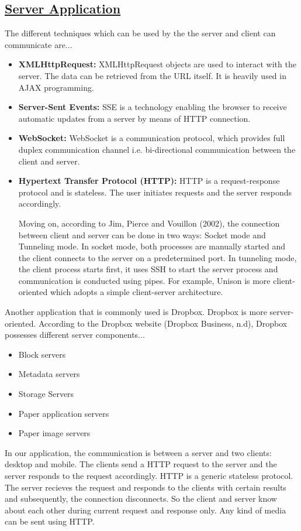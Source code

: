 \documentclass{article}
\begin{document}
\subsection{\underline{Server Application}}
The different techniques which can be used by the the server and client can communicate are...
\begin{itemize}
\item \textbf{XMLHttpRequest:} XMLHttpRequest objects are used to interact with the server. The data can be retrieved from the URL itself. It is heavily used in AJAX programming.
\item \textbf{Server-Sent Events:} SSE is a technology enabling the browser to receive automatic updates from a server by means of HTTP connection.
\item \textbf{WebSocket:} WebSocket is a communication protocol, which provides full duplex communication channel i.e. bi-directional communication between the client and server.
\item \textbf{Hypertext Transfer Protocol (HTTP):} HTTP is a request-response protocol and is stateless. The user initiates requests and the server responds accordingly.

Moving on, according to Jim, Pierce and Vouillon (2002), the connection between client and server can be done in two ways: Socket mode and Tunneling mode. In socket mode, both processes are manually started and the client connects to the server on a predetermined port. In tunneling mode, the client process starts first, it uses SSH to start the server process and communication is conducted using pipes. For example, Unison is more client-oriented which adopts a simple client-server architecture.
\end{itemize}
 
Another application that is commonly used is Dropbox. Dropbox is more server-oriented. According to the Dropbox website (Dropbox Business, n.d), Dropbox possesses different server components...
\begin{itemize}
\item Block servers
\item Metadata servers
\item Storage Servers
\item Paper application servers
\item Paper image servers
\end{itemize}

In our application, the communication is between a server and two clients: desktop and mobile. The clients send a HTTP request to the server and the server responds to the request accordingly. HTTP is a generic stateless protocol. The server recieves the request and responds to the clients with certain results and subsequently, the connection disconnects. So the client and server know about each other during current request and response only. Any kind of media can be sent using HTTP.
\end{document}
